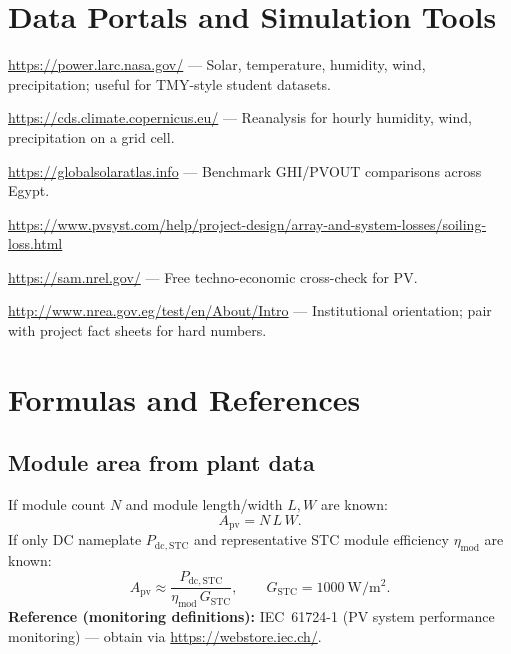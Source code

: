 \documentclass[11pt,a4paper]{article}
\begin{document}
\section{Data Portals and Simulation Tools}
\begin{description}[style=nextline,leftmargin=0pt,labelwidth=!]
  \item[NASA POWER] \url{https://power.larc.nasa.gov/} --- Solar, temperature, humidity, wind, precipitation; useful for TMY-style student datasets.
  \item[Copernicus CDS (ERA5)] \url{https://cds.climate.copernicus.eu/} --- Reanalysis for hourly humidity, wind, precipitation on a grid cell.
  \item[Global Solar Atlas] \url{https://globalsolaratlas.info} --- Benchmark GHI/PVOUT comparisons across Egypt.
  \item[PVsyst documentation (soiling)] \url{https://www.pvsyst.com/help/project-design/array-and-system-losses/soiling-loss.html}
  \item[NREL SAM] \url{https://sam.nrel.gov/} --- Free techno-economic cross-check for PV.
  \item[NREA (Egypt)] \url{http://www.nrea.gov.eg/test/en/About/Intro} --- Institutional orientation; pair with project fact sheets for hard numbers.
\end{description}

\section{Formulas and References}

\subsection{Module area from plant data}
If module count $N$ and module length/width $L,W$ are known:
\begin{equation}
A_{\mathrm{pv}} = N\,L\,W .
\end{equation}
If only DC nameplate $P_{\mathrm{dc,STC}}$ and representative STC module efficiency $\eta_{\mathrm{mod}}$ are known:
\begin{equation}
A_{\mathrm{pv}} \approx \frac{P_{\mathrm{dc,STC}}}{\eta_{\mathrm{mod}}\,G_{\mathrm{STC}}},
\qquad G_{\mathrm{STC}} = 1000\ \mathrm{W/m^2}.
\end{equation}
\textbf{Reference (monitoring definitions):} IEC~61724-1 (PV system performance monitoring) --- obtain via \url{https://webstore.iec.ch/}.
\end{document}
